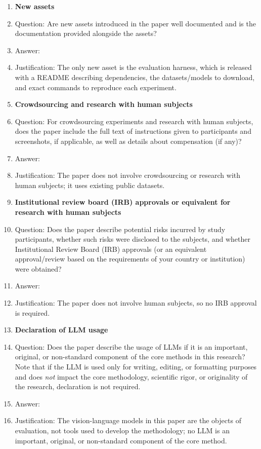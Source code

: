 \begin{enumerate}
\item {\bf New assets}
    \item[] Question: Are new assets introduced in the paper well documented and is the documentation provided alongside the assets?
    \item[] Answer: \answerYes{}
    \item[] Justification: The only new asset is the evaluation harness, which is released with a README describing dependencies, the datasets/models to download, and exact commands to reproduce each experiment.

\item {\bf Crowdsourcing and research with human subjects}
    \item[] Question: For crowdsourcing experiments and research with human subjects, does the paper include the full text of instructions given to participants and screenshots, if applicable, as well as details about compensation (if any)?
    \item[] Answer: \answerNA{}
    \item[] Justification: The paper does not involve crowdsourcing or research with human subjects; it uses existing public datasets.

\item {\bf Institutional review board (IRB) approvals or equivalent for research with human subjects}
    \item[] Question: Does the paper describe potential risks incurred by study participants, whether such risks were disclosed to the subjects, and whether Institutional Review Board (IRB) approvals (or an equivalent approval/review based on the requirements of your country or institution) were obtained?
    \item[] Answer: \answerNA{}
    \item[] Justification: The paper does not involve human subjects, so no IRB approval is required.

\item {\bf Declaration of LLM usage}
    \item[] Question: Does the paper describe the usage of LLMs if it is an important, original, or non-standard component of the core methods in this research? Note that if the LLM is used only for writing, editing, or formatting purposes and does \emph{not} impact the core methodology, scientific rigor, or originality of the research, declaration is not required.
    \item[] Answer: \answerNA{}
    \item[] Justification: The vision-language models in this paper are the objects of evaluation, not tools used to develop the methodology; no LLM is an important, original, or non-standard component of the core method.

\end{enumerate}
